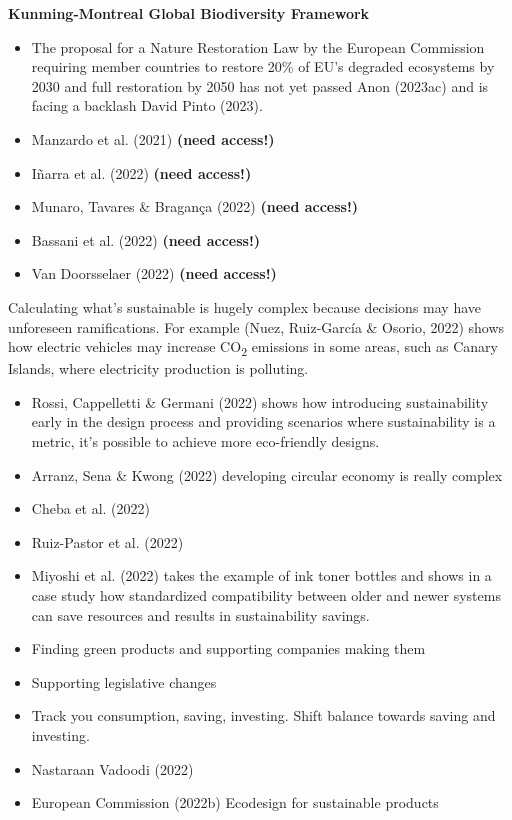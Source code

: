 \documentclass[
  letterpaper,
  DIV=11,
  numbers=noendperiod]{scrartcl}
\begin{document}
\textbf{Kunming-Montreal Global Biodiversity Framework}

\begin{itemize}
\item
  The proposal for a Nature Restoration Law by the European Commission
  requiring member countries to restore 20\% of EU's degraded ecosystems
  by 2030 and full restoration by 2050 has not yet passed Anon (2023ac)
  and is facing a backlash David Pinto (2023).
\item
  Manzardo et al. (2021) \textbf{(need access!)}
\item
  Iñarra et al. (2022) \textbf{(need access!)}
\item
  Munaro, Tavares \& Bragança (2022) \textbf{(need access!)}
\item
  Bassani et al. (2022) \textbf{(need access!)}
\item
  Van Doorsselaer (2022) \textbf{(need access!)}
\end{itemize}

Calculating what's sustainable is hugely complex because decisions may
have unforeseen ramifications. For example (Nuez, Ruiz-García \& Osorio,
2022) shows how electric vehicles may increase CO\textsubscript{2}
emissions in some areas, such as Canary Islands, where electricity
production is polluting.

\begin{itemize}
\item
  Rossi, Cappelletti \& Germani (2022) shows how introducing
  sustainability early in the design process and providing scenarios
  where sustainability is a metric, it's possible to achieve more
  eco-friendly designs.
\item
  Arranz, Sena \& Kwong (2022) developing circular economy is really
  complex
\item
  Cheba et al. (2022)
\item
  Ruiz-Pastor et al. (2022)
\item
  Miyoshi et al. (2022) takes the example of ink toner bottles and shows
  in a case study how standardized compatibility between older and newer
  systems can save resources and results in sustainability savings.
\item
  Finding green products and supporting companies making them
\item
  Supporting legislative changes
\item
  Track you consumption, saving, investing. Shift balance towards saving
  and investing.
\item
  Nastaraan Vadoodi (2022)
\item
  European Commission (2022b) Ecodesign for sustainable products
\end{itemize}
\end{document}
